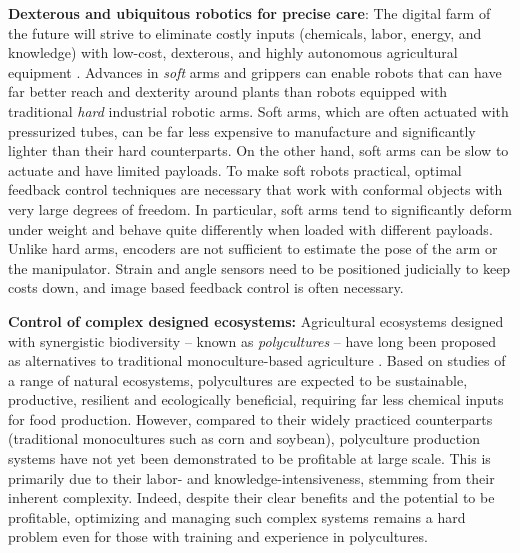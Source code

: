 \textbf{Dexterous and ubiquitous robotics for precise care}​: The digital farm of the future will strive to eliminate costly inputs (chemicals, labor, energy, and knowledge) with low-cost, dexterous, and highly autonomous agricultural equipment \cite{pedersen2006agricultural}. Advances in \textit{soft} arms and grippers can enable robots that can have far better reach and dexterity around plants than robots equipped with traditional \textit{hard} industrial robotic arms. Soft arms, which are often actuated with pressurized tubes, can be far less expensive to manufacture and significantly lighter than their hard counterparts. On the other hand, soft arms can be slow to actuate and have limited payloads. To make soft robots practical, optimal feedback control techniques are necessary that work with conformal objects with very large degrees of freedom. In particular, soft arms tend to significantly deform under weight and behave quite differently when loaded with different payloads. Unlike hard arms, encoders are not sufficient to estimate the pose of the arm or the manipulator. Strain and angle sensors need to be positioned judicially to keep costs down, and image based feedback control is often  necessary.  %

\textbf{Control of complex designed ecosystems:}   Agricultural ecosystems designed with synergistic biodiversity -- known as \textit{polycultures} -- have long been proposed as alternatives to traditional monoculture-based agriculture \cite{dewar2007perennial,lin2011resilience,thrupp2000linking,letourneau2011does}. Based on studies of a range of natural ecosystems, polycultures are expected to be sustainable, productive, resilient and ecologically beneficial, requiring far less chemical inputs for food production. However, compared to their widely practiced counterparts (traditional monocultures such as corn and soybean), polyculture production systems have not yet been demonstrated to be profitable at large scale. This is primarily %
due to their labor- and knowledge-intensiveness, stemming from their inherent complexity. Indeed, despite their clear benefits and the potential to be profitable, optimizing and managing such complex systems remains a hard problem even for those with training and experience in polycultures. 

